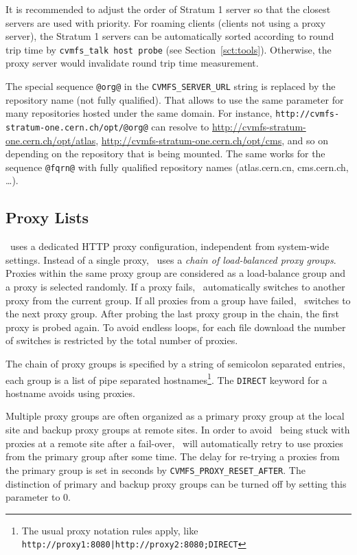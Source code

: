 It is recommended to adjust the order of Stratum 1 server so that the closest servers are used with priority.
For roaming clients (\ie clients not using a proxy server), the Stratum 1 servers can be automatically sorted according to round trip time by \texttt{cvmfs\_talk host probe} (see Section~\ref{sct:tools}).
Otherwise, the proxy server would invalidate round trip time measurement.

The special sequence \texttt{@org@} in the \texttt{CVMFS\_SERVER\_URL} string is replaced by the repository name (not fully qualified).
That allows to use the same parameter for many repositories hosted under the same domain.
For instance, \texttt{http://cvmfs-stratum-one.cern.ch/opt/@org@} can resolve to \url{http://cvmfs-stratum-one.cern.ch/opt/atlas}, \url{http://cvmfs-stratum-one.cern.ch/opt/cms}, and so on depending on the repository that is being mounted.
The same works for the sequence \texttt{@fqrn@} with fully qualified repository names (\eg atlas.cern.cn, cms.cern.ch, \dots).

\subsection{Proxy Lists}
\cvmfs\ uses a dedicated HTTP proxy configuration, independent from system-wide settings.
Instead of a single proxy, \cvmfs\ uses a \emph{chain of load-balanced proxy groups}.
Proxies within the same proxy group are considered as a load-balance group and a proxy is selected randomly.
If a proxy fails, \cvmfs\ automatically switches to another proxy from the current group.
If all proxies from a group have failed, \cvmfs\ switches to the next proxy group.
After probing the last proxy group in the chain, the first proxy is probed again.
To avoid endless loops, for each file download the number of switches is restricted by the total number of proxies.

The chain of proxy groups is specified by a string of semicolon separated entries, each group is a list of pipe separated hostnames\footnote{The usual proxy notation rules apply, like \texttt{http://proxy1:8080|http://proxy2:8080;DIRECT}}.
The \texttt{DIRECT} keyword for a hostname avoids using proxies.

Multiple proxy groups are often organized as a primary proxy group at the local site and backup proxy groups at remote sites.
In order to avoid \cvmfs\ being stuck with proxies at a remote site after a fail-over, \cvmfs\ will automatically retry to use proxies from the primary group after some time.
The delay for re-trying a proxies from the primary group is set in seconds by \texttt{CVMFS\_PROXY\_RESET\_AFTER}.
The distinction of primary and backup proxy groups can be turned off by setting this parameter to 0.

